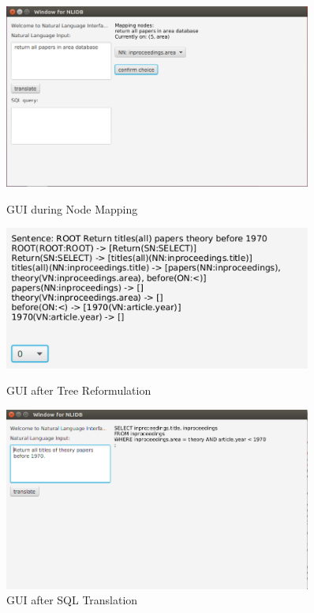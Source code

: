\documentclass[twocolumn]{article}
\begin{document}
\begin{figure}
	\centering
	\begin{minipage}{0.45\textwidth}
		\centering
		\includegraphics[width=0.9\textwidth]{figures/gui_nodes_mapping.png} %
		\caption{GUI during Node Mapping}
	\end{minipage}\hfill
	\begin{minipage}{0.45\textwidth}
		\centering
		\includegraphics[width=0.9\textwidth]{figures/gui_tree_adjustor1.png} %
		\caption{GUI after Tree Reformulation}
	\end{minipage}\hfill
	\begin{minipage}{0.45\textwidth}
		\centering
		\includegraphics[width=0.9\textwidth]{figures/gui_translation.png} %
		\caption{GUI after SQL Translation}
	\end{minipage}
\end{figure}
\end{document}
